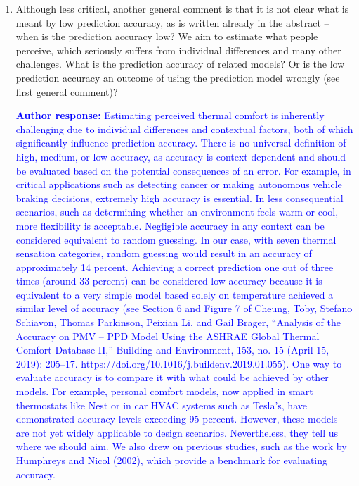 \documentclass[a4paper, 10pt]{letter}
\newcommand{\response}[1]{\textcolor{blue}{\textbf{Author response:} #1}}
\begin{document}
\begin{letter}
\begin{enumerate}
            \item Although less critical, another general comment is that it is not clear what is meant by low prediction accuracy, as is written already in the abstract -- when is the prediction accuracy low?
            We aim to estimate what people perceive, which seriously suffers from individual differences and many other challenges.
            What is the prediction accuracy of related models?
            Or is the low prediction accuracy an outcome of using the prediction model wrongly (see first general comment)?

            \response{
                Estimating perceived thermal comfort is inherently challenging due to individual differences and contextual factors, both of which significantly influence prediction accuracy. 
                There is no universal definition of high, medium, or low accuracy, as accuracy is context-dependent and should be evaluated based on the potential consequences of an error. 
                For example, in critical applications such as detecting cancer or making autonomous vehicle braking decisions, extremely high accuracy is essential. 
                In less consequential scenarios, such as determining whether an environment feels warm or cool, more flexibility is acceptable. 
                Negligible accuracy in any context can be considered equivalent to random guessing. 
                In our case, with seven thermal sensation categories, random guessing would result in an accuracy of approximately 14 percent. 
                Achieving a correct prediction one out of three times (around 33 percent) can be considered low accuracy because it is equivalent to a very simple model based solely on temperature achieved a similar level of accuracy (see Section 6 and Figure 7 of Cheung, Toby, Stefano Schiavon, Thomas Parkinson, Peixian Li, and Gail Brager, “Analysis of the Accuracy on PMV – PPD Model Using the ASHRAE Global Thermal Comfort Database II,” Building and Environment, 153, no. 15 (April 15, 2019): 205–17. https://doi.org/10.1016/j.buildenv.2019.01.055).
                One way to evaluate accuracy is to compare it with what could be achieved by other models. 
                For example, personal comfort models, now applied in smart thermostats like Nest or in car HVAC systems such as Tesla’s, have demonstrated accuracy levels exceeding 95 percent. 
                However, these models are not yet widely applicable to design scenarios. 
                Nevertheless, they tell us where we should aim. 
                We also drew on previous studies, such as the work by Humphreys and Nicol (2002), which provide a benchmark for evaluating accuracy. 
}
\end{enumerate}
\end{letter}
\end{document}
